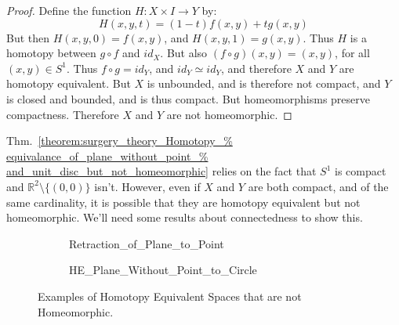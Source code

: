 \documentclass[crop=false,class=book,oneside]{standalone}
\begin{document}
\begin{proof}
                Define the function $H:X\times{I}\rightarrow{Y}$ by:
                \begin{equation}
                    H(x,y,t)=(1-t)f(x,y)+tg(x,y)
                \end{equation}
                But then $H(x,y,0)=f(x,y)$, and $H(x,y,1)=g(x,y)$. Thus $H$ is a
                homotopy between ${g}\circ{f}$ and $id_{X}$. But also
                $({f}\circ{g})(x,y)=(x,y)$, for all $(x,y)\in S^{1}$.
                Thus ${f}\circ{g}=id_{Y}$, and ${id_{Y}}\simeq{id_{Y}}$,
                and therefore $X$ and $Y$ are homotopy equivalent.
                But $X$ is unbounded, and is therefore not compact,
                and $Y$ is closed and bounded, and is thus compact.
                But homeomorphisms preserve compactness. Therefore $X$
                and $Y$ are not homeomorphic.
            \end{proof}
            Thm.~\ref{theorem:surgery_theory_Homotopy_%
                      equivalance_of_plane_without_point_%
                      and_unit_disc_but_not_homeomorphic}
            relies on the fact that $S^{1}$ is compact and
            $\mathbb{R}^{2}\setminus\{(0,0)\}$ isn't.
            However, even if $X$ and $Y$ are both
            compact, and of the same cardinality, it is possible
            that they are homotopy equivalent but not homeomorphic.
            We'll need some results about connectedness to show this.
            \begin{figure}[H]
                \centering
                \captionsetup{type=figure}
                \begin{subfigure}[b]{0.33\textwidth}
                    \captionsetup{type=figure}
                    \centering
                    {Retraction_of_Plane_to_Point}
                    \label{fig:surgery_theory_course_homotopy_%
                           equivalence_diagram_of_plane_with_point}
                \end{subfigure}
                \begin{subfigure}[b]{0.66\textwidth}
                    \captionsetup{type=figure}
                    \centering
                    
                              {HE_Plane_Without_Point_to_Circle}
                    \label{fig:surgery_theory_homotopy_equivalence_%
                           between_the_plane_with_a_point_removed_%
                           and_the_unit_circle}
                \end{subfigure}
                \caption{Examples of Homotopy Equivalent Spaces that are not Homeomorphic.}
                \label{fig:surgery_theory_course_various_HE_but_not_homeo_examples}
            \end{figure}
\end{document}
